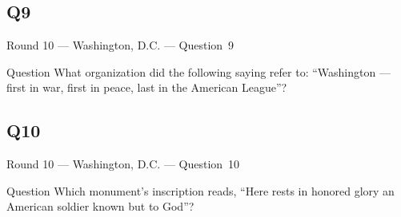 \documentclass[11pt]{beamer}
\begin{document}
\subsection*{Q9}
\begin{frame}[t]{Round 10 --- Washington, D.C. --- \mbox{Question 9}}
    \vspace{-0.5em}
    \begin{block}{Question}
        What organization did the following saying refer to: ``Washington --- first in war, first in peace, last in the American League''?
    \end{block}
\end{frame}
\subsection*{Q10}
\begin{frame}[t]{Round 10 --- Washington, D.C. --- \mbox{Question 10}}
    \vspace{-0.5em}
    \begin{block}{Question}
        Which monument's inscription reads, ``Here rests in honored glory an American soldier known but to God''?
    \end{block}
\end{frame}
\end{document}
